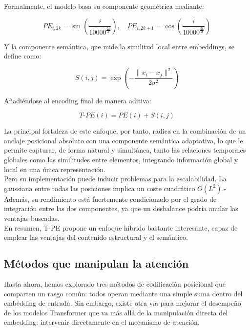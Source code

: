 Formalmente, el modelo basa su componente geométrica mediante:

\begin{equation}
	PE_{i, 2k} = \sin\left(\frac{i}{10000^{\frac{2k}{d}}}\right), \quad
	PE_{i, 2k+1} = \cos\left(\frac{i}{10000^{\frac{2k}{d}}}\right)
\end{equation}

Y la componente semántica, que mide la similitud local entre embeddings, se define como:

$$S(i, j) = \exp\left( -\frac{\|x_i - x_j\|^2}{2\sigma^2} \right)$$

Añadiéndose al encoding final de manera aditiva:

$$T\text{-}PE(i) = PE(i) + S(i, j)$$


La principal fortaleza de este enfoque, por tanto, radica en la combinación de un anclaje posicional absoluto con una componente semántica adaptativa, lo que le permite capturar, de forma natural y simultánea, tanto las relaciones temporales globales como las similitudes entre elementos, integrando información global y local en una única representación.\\

Pero su implementación puede inducir problemas para la escalabilidad. La gaussiana entre todas las posiciones implica un coste cuadrático $O(L^2)$.- Además, su rendimiento está fuertemente condicionado por el grado de integración entre las dos componentes, ya que un desbalance podría anular las ventajas buscadas.\\

En resumen, T-PE propone un enfoque híbrido bastante interesante, capaz de emplear las ventajas del contenido estructural y el semántico.


\subsection{Métodos que manipulan la atención}

Hasta ahora, hemos explorado tres métodos de codificación posicional que comparten un rasgo común: todos operan mediante una simple suma dentro del embedding de entrada. Sin embargo, existe otra vía para mejorar el desempeño de los modelos Transformer que va más allá de la manipulación directa del embedding: intervenir directamente en el mecanismo de atención.\\

